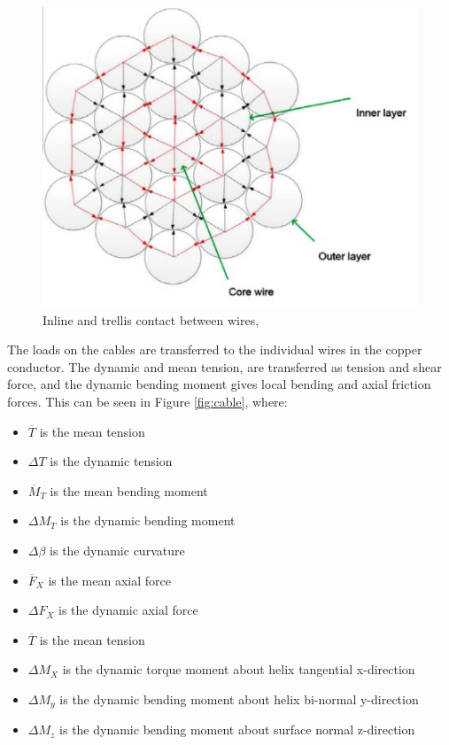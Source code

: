   \begin{figure}[H]
\centering
\includegraphics[scale=0.9]{figures/cross}
\caption[$\; \:$Inline and trellis contact between wires]{Inline and trellis contact between wires, \cite{Nasution2013} }
 \label{fig:cross}
\end{figure}

\noindent The loads on the cables are transferred to the individual wires in the copper conductor. The dynamic and mean tension, are transferred as tension and shear force, and the dynamic bending moment gives local bending and axial friction forces. This can be seen in Figure \ref{fig:cable}, where:
\begin{itemize}
    \item $\overline T$ is the mean tension
    \item $\Delta T$ is the dynamic tension
    \item $\overline M_T$ is the mean bending moment
    \item $\Delta M_T$ is the dynamic bending moment
    \item $\Delta \beta$ is the dynamic curvature
    \item $\overline F_X$ is the mean axial force
    \item $\Delta F_X$ is the dynamic axial force
    \item $\overline T$ is the mean tension
    \item $\Delta M_X$ is the dynamic torque moment about helix tangential x-direction
    \item $\Delta M_y$ is the dynamic bending moment about helix bi-normal y-direction
    \item $\Delta M_z$ is the dynamic bending moment about surface normal z-direction
\end{itemize}


